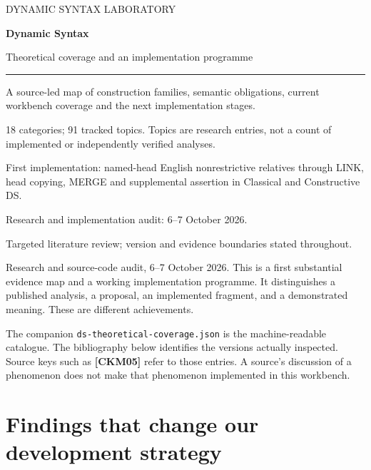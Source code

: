 \documentclass[11pt,a4paper]{article}
\begin{document}
\begin{titlepage}
\thispagestyle{empty}
\vspace*{20mm}
{\small\color{DSmuted}DYNAMIC SYNTAX LABORATORY\par}
\vspace{14mm}
{\fontsize{33}{38}\selectfont\bfseries\color{DSgreen}Dynamic Syntax\par}
\vspace{5mm}
{\Large Theoretical coverage and an implementation programme\par}
\vspace{10mm}
{\color{DSgreen}\rule{\linewidth}{0.7pt}}
\vspace{8mm}
{\large A source-led map of construction families, semantic obligations,
current workbench coverage and the next implementation stages.\par}
\vspace{10mm}
18 categories; 91 tracked topics. Topics are research entries, not a count of
implemented or independently verified analyses.\par
\vspace{8mm}
First implementation: named-head English nonrestrictive relatives through
LINK, head copying, MERGE and supplemental assertion in Classical and
Constructive DS.\par
\vfill
Research and implementation audit: 6--7 October 2026.\par
Targeted literature review; version and evidence boundaries stated throughout.\par
\end{titlepage}
\tableofcontents
\clearpage
{}
Research and source-code audit, 6--7 October 2026. This is a first
substantial evidence map and a working implementation programme. It
distinguishes a published analysis, a proposal, an implemented fragment,
and a demonstrated meaning. These are different achievements.

The companion \nolinkurl{ds-theoretical-coverage.json} is the
machine-readable catalogue. The bibliography below identifies the
versions actually inspected. Source keys such as \textbf{{[}CKM05{]}}
refer to those entries. A source's discussion of a phenomenon does not
make that phenomenon implemented in this workbench.

\section{Findings that change our development
strategy}\label{findings-that-change-our-development-strategy}
\end{document}
